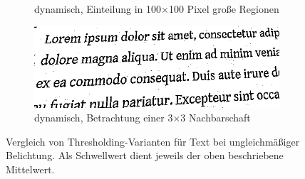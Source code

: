 \begin{figure}[H]
\begin{subfigure}{0.49\linewidth}
    \caption{dynamisch, Einteilung in 100$\times$100 Pixel große Regionen}
  \end{subfigure}
  \begin{subfigure}{0.49\linewidth}
    \centering
    \includegraphics[width=\linewidth]{img/basics/segmentation/dynamic}
    \caption{dynamisch, Betrachtung einer 3$\times$3 Nachbarschaft}
  \end{subfigure}
  \caption[Vergleich von Thresholding-Varianten]{Vergleich von Thresholding-Varianten für Text bei ungleichmäßiger Belichtung. Als Schwellwert dient jeweils der oben beschriebene Mittelwert.}
\end{figure}
